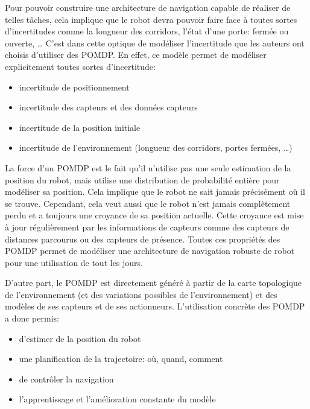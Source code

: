 \documentclass[paper=a4, fontsize=11pt]{scrartcl} %
\numberwithin{equation}{section} %
\numberwithin{figure}{section} %
\numberwithin{table}{section} %
\begin{document}
Pour pouvoir construire une architecture de navigation capable de réaliser de telles tâches, cela implique que le robot devra pouvoir faire face à toutes sortes d'incertitudes comme la longueur des corridors, l'état d'une porte: fermée ou ouverte, \ldots
C'est dans cette optique de modéliser l'incertitude que les auteurs ont choisis d'utiliser des POMDP.
En effet, ce modèle permet de modéliser explicitement toutes sortes d'incertitude:
\begin{itemize}
  \item incertitude de positionnement
  \item incertitude des capteurs et des données capteurs
  \item incertitude de la position initiale
  \item incertitude de l'environnement (longueur des corridors, portes fermées, \ldots)
\end{itemize}
La force d'un POMDP est le fait qu'il n'utilise pas une seule estimation de la position du robot, mais utilise une distribution de probabilité entière pour modéliser sa position.
Cela implique que le robot ne sait jamais précisément où il se trouve.
Cependant, cela veut aussi que le robot n'est jamais complètement perdu et a toujours une croyance de sa position actuelle.
Cette croyance est mise à jour régulièrement par les informations de capteurs comme des capteurs de distances parcourus ou des capteurs de présence.
Toutes ces propriétés des POMDP permet de modéliser une architecture de navigation robuste de robot pour une utilisation de tout les jours.

D'autre part, le POMDP est directement généré à partir de la carte topologique de l'environnement (et des variations possibles de l'environnement) et des modèles de ses capteurs et de ses actionneurs.
L'utilisation concrète des POMDP a donc permis:
\begin{itemize}
  \item d'estimer de la position du robot
  \item une planification de la trajectoire: où, quand, comment
  \item de contrôler la navigation
  \item l'apprentissage et l'amélioration constante du modèle
\end{itemize}





\end{document}
